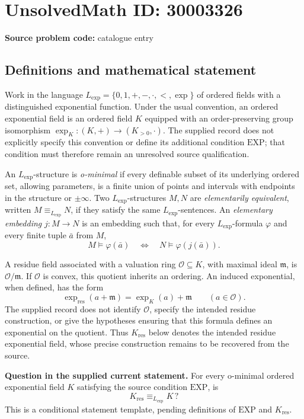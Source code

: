 \documentclass[11pt]{article}
\begin{document}
\section*{UnsolvedMath ID: 30003326}
\textbf{Source problem code:} catalogue entry
\subsection{Definitions and mathematical statement}
Work in the language \(L_{\exp}=\{0,1,+,-,\cdot,<,\exp\}\) of ordered fields with a distinguished exponential function. Under the usual convention, an ordered exponential field is an ordered field \(K\) equipped with an order-preserving group isomorphism \(\exp_K:(K,+)\to(K_{>0},\cdot)\). The supplied record does not explicitly specify this convention or define its additional condition \(\mathrm{EXP}\); that condition must therefore remain an unresolved source qualification.

An \(L_{\exp}\)-structure is \emph{o-minimal} if every definable subset of its underlying ordered set, allowing parameters, is a finite union of points and intervals with endpoints in the structure or \(\pm\infty\). Two \(L_{\exp}\)-structures \(M,N\) are \emph{elementarily equivalent}, written \(M\equiv_{L_{\exp}}N\), if they satisfy the same \(L_{\exp}\)-sentences. An \emph{elementary embedding} \(j:M\to N\) is an embedding such that, for every \(L_{\exp}\)-formula \(\varphi\) and every finite tuple \(\bar a\) from \(M\),
\[
M\models\varphi(\bar a)\quad\Longleftrightarrow\quad N\models\varphi(j(\bar a)).
\]

A residue field associated with a valuation ring \(\mathcal O\subseteq K\), with maximal ideal \(\mathfrak m\), is \(\mathcal O/\mathfrak m\). If \(\mathcal O\) is convex, this quotient inherits an ordering. An induced exponential, when defined, has the form
\[
\exp_{\mathrm{res}}(a+\mathfrak m)=\exp_K(a)+\mathfrak m\qquad(a\in\mathcal O).
\]
The supplied record does not identify \(\mathcal O\), specify the intended residue construction, or give the hypotheses ensuring that this formula defines an exponential on the quotient. Thus \(K_{\mathrm{res}}\) below denotes the intended residue exponential field, whose precise construction remains to be recovered from the source.

\textbf{Question in the supplied current statement.} For every o-minimal ordered exponential field \(K\) satisfying the source condition \(\mathrm{EXP}\), is
\[
K_{\mathrm{res}}\equiv_{L_{\exp}}K\,?
\]
This is a conditional statement template, pending definitions of \(\mathrm{EXP}\) and \(K_{\mathrm{res}}\).
\end{document}
